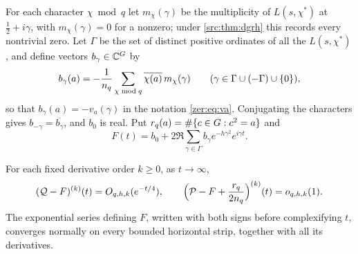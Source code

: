 For each character $\chi\bmod q$ let $m_\chi(\gamma)$ be the multiplicity of $L(s,\chi^*)$ at
$\tfrac12+i\gamma$, with $m_\chi(\gamma)=0$ for a nonzero; under \cref{src:thm:dgrh} this records
every nontrivial zero. Let $\Gamma$ be the set of distinct positive ordinates of all the
$L(s,\chi^*)$, and define vectors $b_\gamma\in\mathbb{C}^{G}$ by
\[
 b_\gamma(a)=-\frac1{n_q}\sum_{\chi\bmod q}\overline{\chi(a)}\,m_\chi(\gamma)
 \qquad(\gamma\in\Gamma\cup(-\Gamma)\cup\{0\}),
\]
so that $b_\gamma(a)=-v_a(\gamma)$ in the notation \eqref{zer:eq:va}. Conjugating the characters
gives $b_{-\gamma}=\overline{b_\gamma}$, and $b_0$ is real. Put $r_q(a)=\#\{c\in G:c^2=a\}$ and
\[
 F(t)=b_0+2\Re\sum_{\gamma\in\Gamma}b_\gamma e^{-h\gamma^2}e^{i\gamma t}.
\]

\begin{proposition}\label{zer:prop:gaussexp}
For each fixed derivative order $k\ge0$, as $t\to\infty$,
\begin{equation}\label{zer:eq:gaussasymp}
 (\mathcal Q-F)^{(k)}(t)=O_{q,h,k}(e^{-t/4}),\qquad
 \Bigl(\mathcal P-F+\frac{r_q}{2n_q}\Bigr)^{(k)}(t)=o_{q,h,k}(1).
\end{equation}
The exponential series defining $F$, written with both signs before complexifying $t$,
converges normally on every bounded horizontal strip, together with all its derivatives.
\end{proposition}
